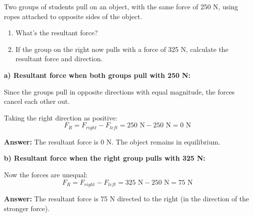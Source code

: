 \begin{exercise}
    Two groups of students pull on an object, with the same force of 250 N, using ropes attached to opposite sides of the object.
    \begin{enumerate}[label=\letraminuscula]
        \item What's the resultant force?
        \item If the group on the right now pulls with a force of 325 N, calculate the resultant force and direction.
    \end{enumerate}

    \begin{solu}
        \textbf{a) Resultant force when both groups pull with 250 N:}

        Since the groups pull in opposite directions with equal magnitude, the forces cancel each other out.

        Taking the right direction as positive:
        $$F_R = F_{right} - F_{left} = 250\text{ N} - 250\text{ N} = 0\text{ N}$$

        \textbf{Answer:} The resultant force is 0 N. The object remains in equilibrium.

        \textbf{b) Resultant force when the right group pulls with 325 N:}

        Now the forces are unequal:
        $$F_R = F_{right} - F_{left} = 325\text{ N} - 250\text{ N} = 75\text{ N}$$

        \textbf{Answer:} The resultant force is 75 N directed to the right (in the direction of the stronger force).
    \end{solu}
\end{exercise}





